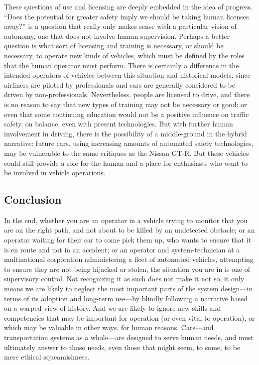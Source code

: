 These questions of use and licensing are deeply embedded in the idea
of progress. ``Does the potential for greater safety imply we should be
taking human licenses away?'' is a question that really only makes
sense with a particular vision of autonomy, one that does not involve
human supervision. Perhaps a better question is what sort of licensing
and training is necessary, or should be necessary, to operate new
kinds of vehicles, which must be defined by the roles that the human
operator must perform. There is certainly a difference in the intended
operators of vehicles between this situation and historical models,
since airliners are piloted by professionals
and cars are generally considered to be driven by non-professionals.
Nevertheless, people are licensed to drive, and there is no reason to
say that new types of training may not be necessary or good;
or even that some continuing education would not be a positive
influence on traffic safety, on balance, even with present
technologies. But with further human involvement in driving, there is
the possibility of a
middle-ground in the hybrid narrative:  future cars, using increasing
amounts of automated safety technologies,
may be vulnerable to the same critiques as the Nissan GT-R. But these
vehicles could still provide a role for the human and a place for
enthusiasts who want to be involved in vehicle operations.

\subsection{Conclusion}

In the end, whether you are an operator in a vehicle trying to monitor that you
are on the right path, and not about to be killed by an undetected
obstacle; or an operator waiting
for their car to come pick them up, who wants to ensure that it is en route
and not in an accident; or an operator and system-technician at a
multinational corporation administering a fleet of automated vehicles,
attempting to ensure they are not being 
hijacked or stolen, the situation you are in is one of supervisory
control. Not recognizing it as such does not make it not so, it only means we are
likely to neglect the most important parts of the system design---in
terms of its adoption and long-term use---by blindly following a
narrative based on a warped view of history. And we are likely to
ignore new skills and competencies that may be important for
operation (or even vital to operation), or which may be valuable in other ways, for
human reasons. Cars---and transportation systems as a whole---are
designed to serve human needs, and must ultimately answer to those
needs, even those that might seem, to some, to be mere ethical squeamishness.


